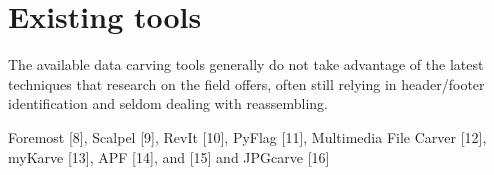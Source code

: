 \section{Existing tools}

The available data carving tools generally do not take advantage of the latest techniques that research on the field offers, often still relying in header/footer identification and seldom dealing with reassembling.

\cite{ali_review_2018}
Foremost [8], Scalpel [9],
RevIt [10], PyFlag [11], Multimedia File Carver
[12], myKarve [13], APF [14], and [15] and
JPGcarve [16]



